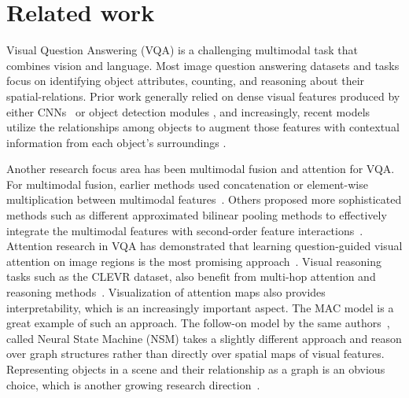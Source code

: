

\section{Related work}
Visual Question Answering (VQA) is a challenging multimodal task that combines vision and language.  Most image question answering datasets and tasks focus on identifying object attributes, counting, and reasoning about their spatial-relations. Prior work generally relied on dense visual features produced by either CNNs~\cite{xiong2016dynamic,yang2016stacked} or object detection modules \cite{desta2018object}, and increasingly, recent models utilize the relationships among objects to augment those features with contextual information from each object’s surroundings \cite{teney2017graph, santoro2017simple}.  

Another research focus area has been multimodal fusion and attention for VQA. For multimodal fusion, earlier methods used concatenation or element-wise multiplication between multimodal features~\cite{zhou2015simple, antol2015}. Others proposed more sophisticated methods such as different approximated bilinear pooling methods to effectively integrate the multimodal features with second-order feature interactions~\cite{fukui2016multimodal, kim2016hadamard}. Attention research in VQA has demonstrated that learning question-guided visual attention on image regions is the most promising approach~\cite{yang2016stacked, chen2015abc, ilievski2016focused}. Visual reasoning tasks such as the CLEVR dataset, also benefit from multi-hop attention and reasoning methods~\cite{hudson2018compositional, song2018explore}. Visualization of attention maps also provides interpretability, which is an increasingly important aspect. The MAC model \cite{hudson2018compositional} is a great example of such an approach. The follow-on model by the same authors~\cite{hudson2019learning}, called Neural State Machine (NSM) takes a slightly different approach and reason over graph structures rather than directly over spatial maps of visual features.  Representing objects in a scene and their relationship as a graph is an obvious choice, which is another growing research direction~\cite{haurilet2019s, teney2017graph, kim2018dynamic}. 

